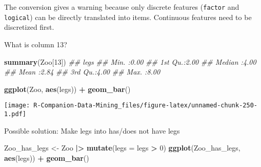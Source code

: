 \documentclass[
  notitlepage]{book}
\newenvironment{Shaded}{\begin{snugshade}}{\end{snugshade}}
\newcommand{\CommentTok}[1]{\textcolor[rgb]{0.56,0.35,0.01}{\textit{#1}}}
\newcommand{\DataTypeTok}[1]{\textcolor[rgb]{0.13,0.29,0.53}{#1}}
\newcommand{\DecValTok}[1]{\textcolor[rgb]{0.00,0.00,0.81}{#1}}
\newcommand{\ErrorTok}[1]{\textcolor[rgb]{0.64,0.00,0.00}{\textbf{#1}}}
\newcommand{\KeywordTok}[1]{\textcolor[rgb]{0.13,0.29,0.53}{\textbf{#1}}}
\newcommand{\NormalTok}[1]{#1}
\newcommand{\OperatorTok}[1]{\textcolor[rgb]{0.81,0.36,0.00}{\textbf{#1}}}
\newcommand{\StringTok}[1]{\textcolor[rgb]{0.31,0.60,0.02}{#1}}
\begin{document}
The conversion gives a warning because only discrete features (\texttt{factor}
and \texttt{logical}) can be directly translated into items. Continuous
features need to be discretized first.

What is column 13?

\begin{Shaded}
\begin{Highlighting}[]
\KeywordTok{summary}\NormalTok{(Zoo[}\DecValTok{13}\NormalTok{])}
\CommentTok{\#\#       legs     }
\CommentTok{\#\#  Min.   :0.00  }
\CommentTok{\#\#  1st Qu.:2.00  }
\CommentTok{\#\#  Median :4.00  }
\CommentTok{\#\#  Mean   :2.84  }
\CommentTok{\#\#  3rd Qu.:4.00  }
\CommentTok{\#\#  Max.   :8.00}
\end{Highlighting}
\end{Shaded}

\begin{Shaded}
\begin{Highlighting}[]
\KeywordTok{ggplot}\NormalTok{(Zoo, }\KeywordTok{aes}\NormalTok{(legs)) }\OperatorTok{+}\StringTok{ }\KeywordTok{geom\_bar}\NormalTok{()}
\end{Highlighting}
\end{Shaded}

\texttt{[image: R-Companion-Data-Mining\_files/figure-latex/unnamed-chunk-250-1.pdf]}

\begin{Shaded}
\end{Shaded}

Possible solution: Make legs into has/does not have legs

\begin{Shaded}
\begin{Highlighting}[]
\NormalTok{Zoo\_has\_legs \textless{}{-}}\StringTok{ }\NormalTok{Zoo }\OperatorTok{|}\ErrorTok{\textgreater{}}\StringTok{ }\KeywordTok{mutate}\NormalTok{(}\DataTypeTok{legs =}\NormalTok{ legs }\OperatorTok{\textgreater{}}\StringTok{ }\DecValTok{0}\NormalTok{)}
\KeywordTok{ggplot}\NormalTok{(Zoo\_has\_legs, }\KeywordTok{aes}\NormalTok{(legs)) }\OperatorTok{+}\StringTok{ }\KeywordTok{geom\_bar}\NormalTok{()}
\end{Highlighting}
\end{Shaded}
\end{document}
